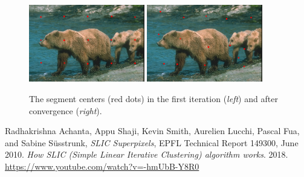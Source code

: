 \documentclass[12pt]{article}
\begin{document}
\begin{figure}
\centering
\includegraphics[width=0.45\textwidth]{images/img1}
\includegraphics[width=0.45\textwidth]{images/img2}
\caption{The segment centers (red dots) in the first iteration (\textit{left}) and after convergence (\textit{right}).}
\label{img2}
\end{figure}

\begin{thebibliography}{99}
Radhakrishna Achanta, Appu Shaji, Kevin Smith, Aurelien Lucchi, Pascal Fua, and Sabine S{\"u}sstrunk, \emph{SLIC Superpixels}, EPFL Technical Report 149300, June 2010.
\emph{How SLIC (Simple Linear Iterative Clustering) algorithm works}. 2018.\\
\url{https://www.youtube.com/watch?v=-hmUbB-Y8R0}
\end{thebibliography}
\end{document}
